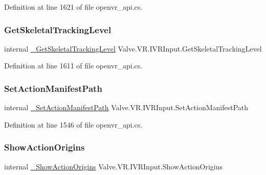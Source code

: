 Definition at line 1621 of file openvr\+\_\+api.\+cs.

\mbox{\label{struct_valve_1_1_v_r_1_1_i_v_r_input_ae77211631324af5588fcbd18f87b65f3}} 
\subsubsection{\texorpdfstring{GetSkeletalTrackingLevel}{GetSkeletalTrackingLevel}}
{\footnotesize\ttfamily internal \mbox{\hyperlink{struct_valve_1_1_v_r_1_1_i_v_r_input_a0521ebd1a374c8e54ca2864d7b6d57eb}{\+\_\+\+Get\+Skeletal\+Tracking\+Level}} Valve.\+V\+R.\+I\+V\+R\+Input.\+Get\+Skeletal\+Tracking\+Level}



Definition at line 1611 of file openvr\+\_\+api.\+cs.

\mbox{\label{struct_valve_1_1_v_r_1_1_i_v_r_input_a7033cdf7a211cd1953ccbf1a266c9adc}} 
\subsubsection{\texorpdfstring{SetActionManifestPath}{SetActionManifestPath}}
{\footnotesize\ttfamily internal \mbox{\hyperlink{struct_valve_1_1_v_r_1_1_i_v_r_input_abe386c0a304c243f737dbfda0340428a}{\+\_\+\+Set\+Action\+Manifest\+Path}} Valve.\+V\+R.\+I\+V\+R\+Input.\+Set\+Action\+Manifest\+Path}



Definition at line 1546 of file openvr\+\_\+api.\+cs.

\mbox{\label{struct_valve_1_1_v_r_1_1_i_v_r_input_a0142f929ca5159989ec8922d4fbf2bff}} 
\subsubsection{\texorpdfstring{ShowActionOrigins}{ShowActionOrigins}}
{\footnotesize\ttfamily internal \mbox{\hyperlink{struct_valve_1_1_v_r_1_1_i_v_r_input_a09f1677e540d63032f2fd346bcde9ff7}{\+\_\+\+Show\+Action\+Origins}} Valve.\+V\+R.\+I\+V\+R\+Input.\+Show\+Action\+Origins}



